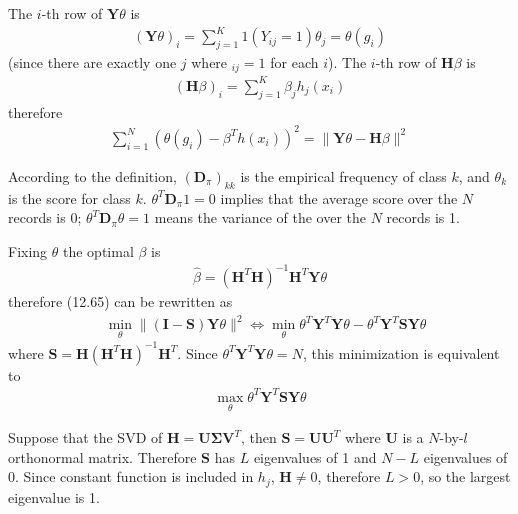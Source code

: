 \begin{exercise}
  \begin{exerciseSection}
    The $i$-th row of $\mathbf{Y}\theta$ is
    \begin{align}
      (\mathbf{Y}\theta)_i = \sum_{j=1}^K 1(Y_{ij}=1)\theta_j = \theta(g_i)
    \end{align}
    (since there are exactly one $j$ where $_{ij}=1$ for each $i$). The $i$-th
    row of $\mathbf{H}\beta$ is
    \begin{align}
      (\mathbf{H}\beta)_i = \sum_{j=1}^K\beta_jh_j(x_i)
    \end{align}
    therefore
    \begin{align}
      \sum_{i=1}^N(\theta(g_i) - \beta^Th(x_i))^2 = \|\mathbf{Y}\theta -
      \mathbf{H}\beta\| ^2
    \end{align}
  \end{exerciseSection}
  
  \begin{exerciseSection}
    According to the definition, $(\mathbf{D}_{\pi})_{kk}$ is the empirical
    frequency of class $k$, and $\theta_k$ is the score for class $k$.
    $\theta^T\mathbf{D}_{\pi}1=0$ implies that the average score over the $N$
    records is 0; $\theta^T\mathbf{D}_{\pi}\theta=1$ means the variance
    of the over the $N$ records is 1.
  \end{exerciseSection}
  
  \begin{exerciseSection}
    Fixing $\theta$ the optimal $\beta$ is
    \begin{align}
      \hat{\beta} = (\mathbf{H}^T\mathbf{H})^{-1}\mathbf{H}^T\mathbf{Y}\theta
    \end{align}
    therefore (12.65) can be rewritten as 
    \begin{align}
      & \min_{\theta}\|(\mathbf{I}-\mathbf{S})\mathbf{Y}\theta\|^2
      \Leftrightarrow  \min_{\theta} \theta^T\mathbf{Y}^T\mathbf{Y}\theta -
      \theta^T\mathbf{Y}^T\mathbf{S}\mathbf{Y}\theta
    \end{align}
    where $\mathbf{S} = \mathbf{H}(\mathbf{H}^T\mathbf{H})^{-1}\mathbf{H}^T$.
    Since  $\theta^T\mathbf{Y}^T\mathbf{Y}\theta = N$, this minimization is
    equivalent to 
    \begin{align}
      \max_{\theta}\theta^T\mathbf{Y}^T\mathbf{S}\mathbf{Y}\theta
    \end{align}
  \end{exerciseSection}
  
  \begin{exerciseSection}
    Suppose that the SVD of $\mathbf{H} = \mathbf{U\Sigma V}^T$, then
    $\mathbf{S} = \mathbf{UU}^T$ where $\mathbf{U}$ is a $N$-by-$l$ orthonormal
    matrix. Therefore $\mathbf{S}$ has $L$ eigenvalues of 1 and $N-L$
    eigenvalues of 0. Since constant function is included in $h_j$, 
    $\mathbf{H}\not=0$, therefore $L>0$, so the largest eigenvalue is 1.
  \end{exerciseSection}
  

\end{exercise}
